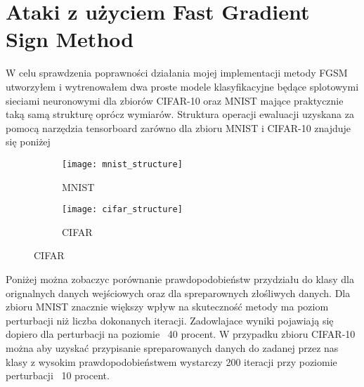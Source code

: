 \documentclass{article}
\begin{document}
\section{Ataki z użyciem Fast Gradient Sign Method}
\label{sec:fgsm}
W celu sprawdzenia poprawności działania mojej implementacji metody FGSM utworzyłem
i wytrenowałem dwa proste modele klasyfikacyjne będące
splotowymi sieciami neuronowymi dla zbiorów CIFAR-10\cite{cifar_10} oraz MNIST\cite{mnist}
mające praktycznie taką samą strukturę oprócz wymiarów.
Struktura operacji ewaluacji uzyskana za pomocą narzędzia tensorboard zarówno dla
zbioru MNIST i CIFAR-10 znajduje się poniżej

\newpage
\vfill

\begin{figure}[ht]
  \begin{subfigure}{.55\textwidth}
    \texttt{[image: mnist\_structure]}
    \caption{MNIST}
    \centering
  \end{subfigure}
  \begin{subfigure}{.55\textwidth}
    \texttt{[image: cifar\_structure]}
    \caption{CIFAR}
    \centering
  \end{subfigure}
\end{figure}

\vfill
\clearpage

Poniżej można zobaczyc porównanie prawdopodobieństw przydziału do klasy dla
orignalnych danych wejściowych oraz dla spreparownych złośliwych danych.
Dla zbioru MNIST znacznie większy wpływ na skuteczność metody ma poziom
perturbacji niż liczba dokonanych iteracji. Zadowlajace wyniki pojawiają
się dopiero dla perturbacji na poziomie ~40 procent.
W przypadku zbioru CIFAR-10 można aby uzyskać przypisanie spreparowanych danych
do zadanej przez nas klasy z wysokim prawdopodobieństwem wystarczy 200 iteracji
przy poziomie perturbacji ~10 procent.
\end{document}
